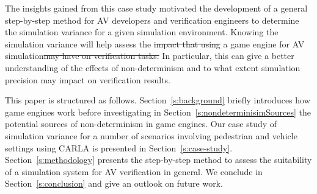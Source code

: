 \documentclass[letterpaper, 10 pt, journal, twoside]{IEEEtran}
\providecommand{\DIFaddtex}[1]{{\protect\color{blue}\uwave{#1}}} %
\providecommand{\DIFdeltex}[1]{{\protect\color{red}\sout{#1}}}                      %
\providecommand{\DIFaddbegin}{} %
\providecommand{\DIFaddend}{} %
\providecommand{\DIFdelbegin}{} %
\providecommand{\DIFdelend}{} %
\providecommand{\DIFadd}[1]{\texorpdfstring{\DIFaddtex{#1}}{#1}} %
\providecommand{\DIFdel}[1]{\texorpdfstring{\DIFdeltex{#1}}{}} %
\begin{document}
The insights gained from this case study motivated the development of a general step-by-step method for AV developers and verification engineers to determine the simulation variance for a given simulation environment. 
%
%
Knowing the simulation variance will help assess the \DIFdelbegin \DIFdel{impact that using }\DIFdelend \DIFaddbegin \DIFadd{suitability of }\DIFaddend a game engine for AV simulation\DIFdelbegin \DIFdel{may have on verification tasks.
}\DIFdelend \DIFaddbegin \DIFadd{.
}\DIFaddend In particular, this can give a better understanding of the effects of non-determinism and to what extent simulation precision may impact on verification results.
%
%
%
%

This paper is structured as follows.
%
Section~\ref{s:background} briefly introduces how game engines work before investigating in Section~\ref{s:nondeterminisimSources} the potential sources of non-determinism in game engines.
%
Our case study of simulation variance for a number of scenarios involving pedestrian and vehicle settings using CARLA is presented in Section~\ref{s:case-study}.
%
Section~\ref{s:methodology} presents the step-by-step method to assess the suitability of a simulation system for AV verification in general. 
%
We conclude in Section~\ref{s:conclusion} and give an outlook on future work.
\end{document}
